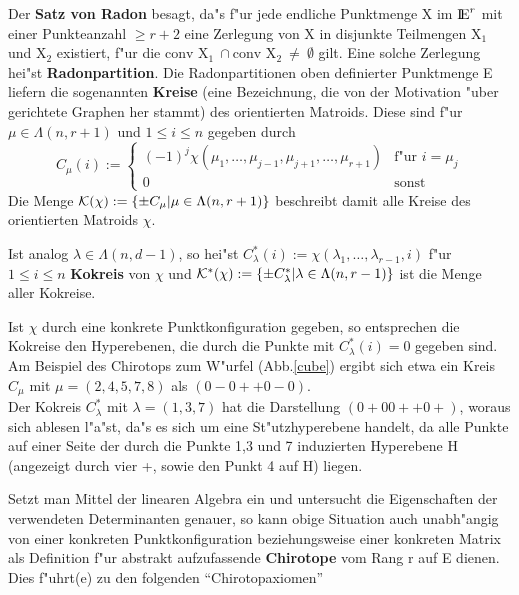 Der {\bf Satz von Radon} besagt, da"s f"ur jede endliche Punktmenge X im $\mbox{$\rm I\!E$}^r$
mit einer Punkteanzahl $\geq r+2$ eine Zerlegung von X in disjunkte Teilmengen
X$_1$ und X$_2$ existiert, f"ur die
$\mbox{conv X}_1~\cap\mbox{conv X}_2~\neq~\emptyset$ gilt. Eine solche
Zerlegung hei"st {\bf Radonpartition}.
Die Radonpartitionen oben definierter Punktmenge E liefern die sogenannten
{\bf Kreise} (eine Bezeichnung, die von der Motivation "uber gerichtete
Graphen her stammt) des orientierten Matroids. Diese sind f"ur
$\mu\in\Lambda(n,r+1)$ und $1\leq i\leq n$ gegeben durch
$$ C_\mu(i) := \left\{\begin{array}{ll}
   (-1)^j\chi(\mu_1,\ldots,\mu_{j-1},\mu_{j+1},\ldots,\mu_{r+1}) &
   \mbox{f"ur } i=\mu_j\\
   0 & \mbox{sonst} \end{array} \right.$$
Die Menge ${\cal K}(\chi):=\{\pm C_\mu|\mu\in \Lambda (n,r+1)\}$ beschreibt
damit alle Kreise des orientierten Matroids $\chi$.

Ist analog $\lambda\in\Lambda (n,d-1)$, so hei"st
$C^*_\lambda(i) := \chi(\lambda_1,\ldots,\lambda_{r-1},i)$ f"ur
$1\leq i\leq n$ {\bf Kokreis}
von $\chi$\label{kokreis} und
${\cal K}^*(\chi) := \{\pm C^*_\lambda|\lambda\in\Lambda (n,r-1)\}$
ist die Menge aller Kokreise.

Ist $\chi$ durch eine konkrete Punktkonfiguration gegeben, so entsprechen
die Kokreise den Hyperebenen, die durch die Punkte mit $C^*_\lambda(i)=0$
gegeben sind. Am Beispiel des Chirotops zum W"urfel (Abb.\ref{cube}) ergibt sich
etwa ein Kreis $C_\mu$ mit $\mu=(2,4,5,7,8)$ als $(0-0++0-0)$.\\
Der Kokreis $C^*_\lambda$ mit $\lambda=(1,3,7)$ hat die Darstellung
$(0+00++0+)$, woraus sich ablesen l"a"st, da"s es sich um eine St"utzhyperebene
handelt, da alle Punkte auf einer Seite der durch die Punkte 1,3 und 7
induzierten Hyperebene H (angezeigt durch vier +, sowie den Punkt 4 auf H) liegen.

Setzt man Mittel der linearen Algebra ein und untersucht die Eigenschaften
der verwendeten Determinanten genauer, so kann obige Situation auch
unabh"angig von einer konkreten Punktkonfiguration beziehungsweise einer
konkreten Matrix als Definition f"ur abstrakt aufzufassende {\bf Chirotope}
 vom Rang r auf E dienen. Dies f"uhrt(e) zu den folgenden
"`Chirotopaxiomen"'

\bcent
{}
\ecent

